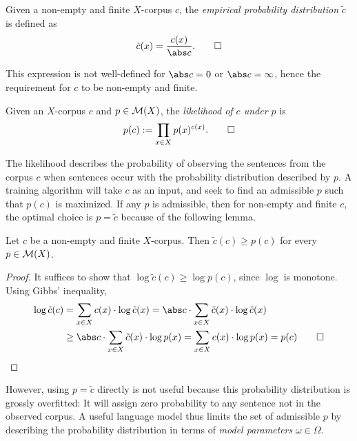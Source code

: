 \begin{definition}
 Given a non-empty and finite $X$-corpus $c$, the \emph{empirical probability
 distribution} $\tilde c$ is defined as
 \[
  \tilde c(x) = \frac{c(x)}{\abs c}.\qedhere
 \]
\end{definition}

This expression is not well-defined for $\abs c = 0$ or $\abs c = \infty$,
hence the requirement for $c$ to be non-empty and finite.

\begin{definition}
 Given an $X$-corpus $c$ and $p\in\mathcal M(X)$, the \emph{likelihood of $c$ under
 $p$} is
 \[
  p(c) := \prod_{x\in X} p(x)^{c(x)}. \qedhere
 \]
\end{definition}

The likelihood describes the probability of observing the sentences from the
corpus $c$ when sentences occur with the probability distribution described by
$p$. A training algorithm will take $c$ as an input, and seek to find an
admissible $p$ such that $p(c)$ is maximized. If any $p$ is admissible, then
for non-empty and finite $c$, the optimal choice is $p = \tilde c$ because of
the following lemma.

\begin{lemma}\label{lemma:empirical1}
 Let $c$ be a non-empty and finite $X$-corpus. Then $\tilde c(c) \geq p(c)$ for
 every $p\in\mathcal M(X)$.
\end{lemma}

\begin{proof}
 It suffices to show that $\log\tilde c(c) \geq \log p(c)$, since $\log$ is
 monotone. Using Gibbs' inequality,
 \begin{align*}
  \log \tilde c(c)
  &= \sum_{x\in X} c(x) \cdot \log \tilde c(x)
  = \abs c \cdot \sum_{x\in X} \tilde c(x) \cdot \log \tilde c(x) \\
  &\geq \abs c \cdot \sum_{x\in X} \tilde c(x) \cdot \log p(x)
  = \sum_{x\in X} c(x) \cdot \log p(x)
  = p(c)
  \qedhere
 \end{align*}
\end{proof}

However, using $p = \tilde c$ directly is not useful because this probability
distribution is grossly overfitted: It will assign zero probability to any
sentence not in the observed corpus. A useful language model thus limits the
set of admissible $p$ by describing the probability distribution in terms of
\emph{model parameters} $\omega\in\Omega$.

